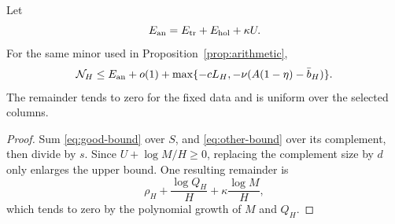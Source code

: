 \begin{proposition}\label{prop:analytic}
Let
\[
 E_{\rm an}=E_{\rm tr}+E_{\rm hol}+\kappa U.
\]
For the same minor used in Proposition~\ref{prop:arithmetic},
\begin{equation}\label{eq:analytic}
 \mathcal N_H\le E_{\rm an}+o(1)
       +\max\{-cL_H,-\nu(A(1-\eta)-\bar b_H)\}.
\end{equation}
The remainder tends to zero for the fixed data and is uniform over
the selected columns.
\end{proposition}
\begin{proof}
Sum \eqref{eq:good-bound} over \(S\), and
\eqref{eq:other-bound} over its complement, then divide by \(s\).
Since \(U+\log M/H\ge0\), replacing the complement size by \(d\)
only enlarges the upper bound.
One resulting remainder is
\[
 \rho_H+\frac{\log Q_H}{H}+\kappa\frac{\log M}{H},
\]
which tends to zero by the polynomial growth of \(M\) and \(Q_H\).
\end{proof}
